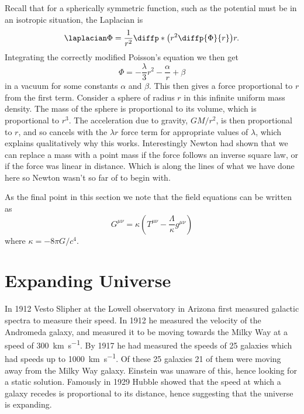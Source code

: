 \documentclass[fleqn]{NotesClass}
\begin{document}
    Recall that for a spherically symmetric function, such as the potential must be in an isotropic situation, the Laplacian is
    \begin{equation}
        \laplacian\Phi = \frac{1}{r^2} \diffp*{\left( r^2\diffp{\Phi}{r} \right)}{r}.
    \end{equation}
    Integrating the correctly modified Poisson's equation we then get
    \begin{equation}
        \Phi = -\frac{\lambda}{3}r^2 - \frac{\alpha}{r} + \beta
    \end{equation}
    in a vacuum for some constants \(\alpha\) and \(\beta\).
    This then gives a force proportional to \(r\) from the first term.
    Consider a sphere of radius \(r\) in this infinite uniform mass density.
    The mass of the sphere is proportional to its volume, which is proportional to \(r^3\).
    The acceleration due to gravity, \(GM/r^2\), is then proportional to \(r\), and so cancels with the \(\lambda r\) force term for appropriate values of \(\lambda\), which explains qualitatively why this works.
    Interestingly Newton had shown that we can replace a mass with a point mass if the force follows an inverse square law, or if the force was linear in distance.
    Which is along the lines of what we have done here so Newton wasn't so far of to begin with.
    
    As the final point in this section we note that the field equations can be written as
    \begin{equation}
        G^{\mu\nu} = \kappa\left( T^{\mu\nu} - \frac{\Lambda}{\kappa}g^{\mu\nu} \right)
    \end{equation}
    where \(\kappa = -8\pi G/c^4\).
    
    \section{Expanding Universe}
    In 1912 Vesto Slipher at the Lowell observatory in Arizona first measured galactic spectra to measure their speed.
    In 1912 he measured the velocity of the Andromeda galaxy, and measured it to be moving towards the Milky Way at a speed of \qty{300}{\kilo\metre\per\second}.
    By 1917 he had measured the speeds of 25 galaxies which had speeds up to \qty{1000}{\kilo\metre\per\second}.
    Of these 25 galaxies 21 of them were moving away from the Milky Way galaxy.
    Einstein was unaware of this, hence looking for a static solution.
    Famously in 1929 Hubble showed that the speed at which a galaxy recedes is proportional to its distance, hence suggesting that the universe is expanding.
    
\end{document}
